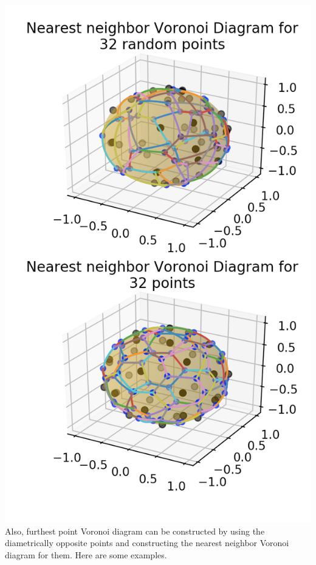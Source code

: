 \documentclass{article}
\begin{document}
\includegraphics[scale=0.4]{v32}
\\
Also, furthest point Voronoi diagram can be constructed by using the diametrically opposite points and constructing the nearest neighbor Voronoi diagram for them. Here are some examples.
\\
\end{document}
